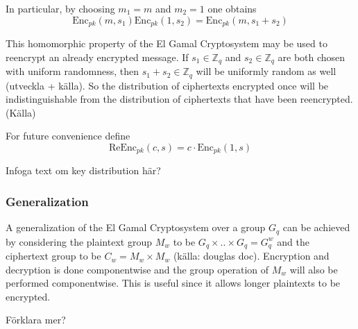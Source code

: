In particular, by choosing $m_1 = m$ and $m_2 = 1$ one obtains
$$
\mathrm{Enc}_{pk}(m, s_1) \mathrm{Enc}_{pk}(1, s_2) = \mathrm{Enc}_{pk}(m, s_1 + s_2)
$$

This homomorphic property of the El Gamal Cryptosystem may be used to
reencrypt an already encrypted message. If $s_1 \in \mathbb{Z}_q$ and
$s_2 \in \mathbb{Z}_q$ are both chosen with uniform randomness, then
$s_1 + s_2 \in \mathbb{Z}_q$ will be uniformly random as well
(utveckla + källa). So the distribution of ciphertexts encrypted once
will be indistinguishable from the distribution of ciphertexts that
have been reencrypted. (Källa)

For future convenience define
$$
\mathrm{ReEnc}_{pk}(c,s) = c \cdot \mathrm{Enc}_{pk}(1,s) 
$$

Infoga text om key distribution här?


\subsubsection{Generalization}
A generalization of the El Gamal Cryptosystem over a group $G_q$ can
be achieved by considering the plaintext group $M_w$ to be $G_q \times
.. \times G_q = G_q^w$ and the ciphertext group to be $C_w = M_w
\times M_w$ (källa: douglas doc). Encryption and decryption is done
componentwise and the group operation of $M_w$ will also be performed
componentwise. This is useful since it allows longer plaintexts to be
encrypted.
 
Förklara mer?
